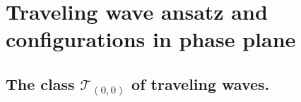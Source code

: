 \documentclass{amsart}
\theoremstyle{definition}
\numberwithin{equation}{section}
\begin{document}




\section{Traveling wave ansatz and configurations in phase plane}

\subsection{The class $\mathcal{T}_{(0,0)}$ of traveling waves.}
\end{document}
